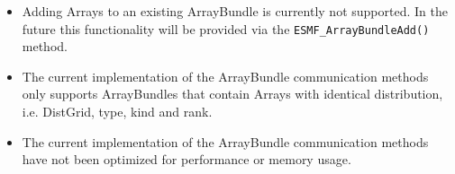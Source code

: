 
\begin{itemize}
\item Adding Arrays to an existing ArrayBundle is currently not supported. In
the future this functionality will be provided via the
{\tt ESMF\_ArrayBundleAdd()} method.
\item The current implementation of the ArrayBundle communication methods only
supports ArrayBundles that contain Arrays with identical distribution, i.e.
DistGrid, type, kind and rank.
\item The current implementation of the ArrayBundle communication methods have
not been optimized for performance or memory usage.
\end{itemize}
